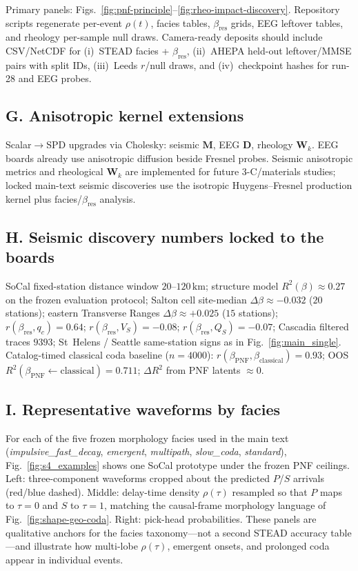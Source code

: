 \documentclass[twocolumn, 10pt]{article}
\begin{document}
Primary panels: Figs.~\ref{fig:pnf-principle}--\ref{fig:rheo-impact-discovery}. Repository scripts regenerate per-event \(\rho(t)\), facies tables, \(\beta_{\mathrm{res}}\) grids, EEG leftover tables, and rheology per-sample null draws. Camera-ready deposits should include CSV/NetCDF for (i)~STEAD facies + \(\beta_{\mathrm{res}}\), (ii)~AHEPA held-out leftover/MMSE pairs with split IDs, (iii)~Leeds \(r\)/null draws, and (iv)~checkpoint hashes for run-28 and EEG probes.

\subsection*{G. Anisotropic kernel extensions}

Scalar\(\to\)SPD upgrades via Cholesky: seismic \(\mathbf{M}\), EEG \(\mathbf{D}\), rheology \(\mathbf{W}_k\). EEG boards already use anisotropic diffusion beside Fresnel probes. Seismic anisotropic metrics and rheological \(\mathbf{W}_k\) are implemented for future 3-C/materials studies; locked main-text seismic discoveries use the isotropic Huygens--Fresnel production kernel plus facies/\(\beta_{\mathrm{res}}\) analysis.

\subsection*{H. Seismic discovery numbers locked to the boards}

SoCal fixed-station distance window \(20\)--\(120\,\mathrm{km}\); structure model \(R^{2}(\beta)\approx0.27\) on the frozen evaluation protocol; Salton cell site-median \(\Delta\beta\approx-0.032\) (\(20\) stations); eastern Transverse Ranges \(\Delta\beta\approx+0.025\) (\(15\) stations); \(r(\beta_{\mathrm{res}},q_c)=0.64\); \(r(\beta_{\mathrm{res}},V_S)=-0.08\); \(r(\beta_{\mathrm{res}},Q_S)=-0.07\); Cascadia filtered traces \(9393\); St~Helens / Seattle same-station signs as in Fig.~\ref{fig:main_single}. Catalog-timed classical coda baseline (\(n=4000\)): \(r(\beta_{\mathrm{PNF}},\beta_{\mathrm{classical}})=0.93\); OOS \(R^{2}(\beta_{\mathrm{PNF}}\leftarrow\mathrm{classical})=0.711\); \(\Delta R^{2}\) from PNF latents \(\approx0\).

\subsection*{I. Representative waveforms by facies}

For each of the five frozen morphology facies used in the main text
(\textit{impulsive\_fast\_decay}, \textit{emergent}, \textit{multipath}, \textit{slow\_coda}, \textit{standard}),
Fig.~\ref{fig:s4_examples} shows one SoCal prototype under the frozen PNF ceilings.
Left: three-component waveforms cropped about the predicted \(P\)/\(S\) arrivals (red/blue dashed).
Middle: delay-time density \(\rho(\tau)\) resampled so that \(P\) maps to \(\tau{=}0\) and \(S\) to \(\tau{=}1\), matching the causal-frame morphology language of Fig.~\ref{fig:shape-geo-coda}.
Right: pick-head probabilities.
These panels are qualitative anchors for the facies taxonomy---not a second STEAD accuracy table---and illustrate how multi-lobe \(\rho(\tau)\), emergent onsets, and prolonged coda appear in individual events.
\end{document}
